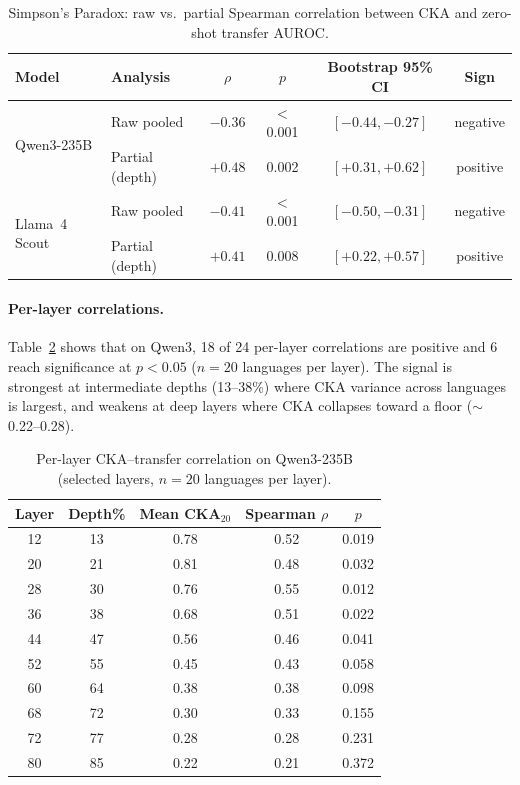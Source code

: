 \documentclass[11pt,a4paper]{article}
\begin{document}
\begin{table}[t]
\centering
\caption{Simpson's Paradox: raw vs.\ partial Spearman correlation between CKA and zero-shot transfer AUROC.}
\label{tab:simpson}
\small
\begin{tabular}{llcccc}
\toprule
Model & Analysis & $\rho$ & $p$ & Bootstrap 95\% CI & Sign \\
\midrule
\multirow{2}{*}{Qwen3-235B}
 & Raw pooled  & $-0.36$ & $<$0.001 & $[-0.44, -0.27]$ & negative \\
 & Partial (depth) & $+0.48$ & 0.002 & $[+0.31, +0.62]$ & positive \\
\midrule
\multirow{2}{*}{Llama~4 Scout}
 & Raw pooled  & $-0.41$ & $<$0.001 & $[-0.50, -0.31]$ & negative \\
 & Partial (depth) & $+0.41$ & 0.008 & $[+0.22, +0.57]$ & positive \\
\bottomrule
\end{tabular}
\end{table}

\paragraph{Per-layer correlations.}
Table~\ref{tab:per_layer_cka} shows that on Qwen3, 18 of 24 per-layer correlations are positive and 6 reach significance at $p < 0.05$ ($n = 20$ languages per layer). The signal is strongest at intermediate depths (13--38\%) where CKA variance across languages is largest, and weakens at deep layers where CKA collapses toward a floor ($\sim$0.22--0.28).

\begin{table}[t]
\centering
\caption{Per-layer CKA--transfer correlation on Qwen3-235B (selected layers, $n=20$ languages per layer).}
\label{tab:per_layer_cka}
\small
\begin{tabular}{ccccc}
\toprule
Layer & Depth\% & Mean CKA$_{20}$ & Spearman $\rho$ & $p$ \\
\midrule
12 & 13 & 0.78 & 0.52 & 0.019 \\
20 & 21 & 0.81 & 0.48 & 0.032 \\
28 & 30 & 0.76 & 0.55 & 0.012 \\
36 & 38 & 0.68 & 0.51 & 0.022 \\
44 & 47 & 0.56 & 0.46 & 0.041 \\
52 & 55 & 0.45 & 0.43 & 0.058 \\
60 & 64 & 0.38 & 0.38 & 0.098 \\
68 & 72 & 0.30 & 0.33 & 0.155 \\
72 & 77 & 0.28 & 0.28 & 0.231 \\
80 & 85 & 0.22 & 0.21 & 0.372 \\
\bottomrule
\end{tabular}
\end{table}
\end{document}
